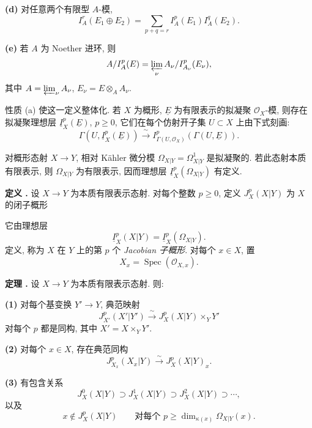 \smallskip
\noindent\textbf{(d)} 对任意两个有限型 $A$-模,
\[
I_A^r(E_1\oplus E_2)
=\sum_{p+q=r}I_A^p(E_1)I_A^q(E_2).
\]

\smallskip
\noindent\textbf{(e)} 若 $A$ 为 Noether 进环, 则
\[
A/I_A^p(E)=\varprojlim_\nu A_\nu/I_{A_\nu}^p(E_\nu),
\]
其中 $A=\varprojlim_\nu A_\nu$, $E_\nu=E\otimes_AA_\nu$.

性质 (a) 使这一定义整体化. 若 $X$ 为概形, $\underline E$ 为有限表示的拟凝聚 $\mathcal O_X$-模, 则存在拟凝聚理想层 $\underline I_X^p(\underline E)$, $p\geq0$, 它们在每个仿射开子集 $U\subset X$ 上由下式刻画:
\[
\Gamma(U,\underline I_X^p(\underline E))
\xrightarrow{\ \sim\ }
I_{\Gamma(U,\mathcal O_X)}^p(\Gamma(U,\underline E)).
\]

对概形态射 $X\longrightarrow Y$, 相对 K\"ahler 微分模 $\Omega_{X|Y}=\Omega^1_{X|Y}$ 是拟凝聚的. 若此态射本质有限表示, 则 $\Omega_{X|Y}$ 为有限表示, 因而理想层 $\underline I_X^p(\Omega_{X|Y})$ 有定义.

\medskip
\noindent\textbf{定义 .}
设 $X\longrightarrow Y$ 为本质有限表示态射. 对每个整数 $p\geq0$, 定义 $J_X^p(X|Y)$ 为 $X$ 的闭子概形


\noindent 它由理想层
\[
\underline I_X^p(X|Y)=\underline I_X^p(\Omega_{X|Y}).
\]
定义, 称为 $X$ 在 $Y$ 上的第 $p$ 个 \emph{Jacobian 子概形}. 对每个 $x\in X$, 置
\[
X_x=\operatorname{Spec}(\mathcal O_{X,x}).
\]



\medskip
\noindent\textbf{定理 .}
设 $X\longrightarrow Y$ 为本质有限表示态射. 则:

\smallskip
\noindent\textbf{(1)} 对每个基变换 $Y'\longrightarrow Y$, 典范映射
\[
J_{X'}^p(X'|Y')\xrightarrow{\ \sim\ }
J_X^p(X|Y)\times_YY'
\]
对每个 $p$ 都是同构, 其中 $X'=X\times_YY'$.

\smallskip
\noindent\textbf{(2)} 对每个 $x\in X$, 存在典范同构
\[
J_{X_x}^p(X_x|Y)\xrightarrow{\ \sim\ }J_X^p(X|Y)_x.
\]

\smallskip
\noindent\textbf{(3)} 有包含关系
\[
J_X^0(X|Y)\supset J_X^1(X|Y)\supset J_X^2(X|Y)\supset\cdots,
\]
以及
\[
x\notin J_X^p(X|Y)
\qquad\text{对每个 }p\geq
\dim_{\kappa(x)}\Omega_{X|Y}(x).
\]


